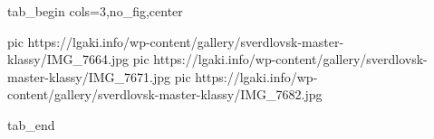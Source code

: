  
 
 
 
 


\ifcmt
  tab_begin cols=3,no_fig,center

     pic https://lgaki.info/wp-content/gallery/sverdlovsk-master-klassy/IMG_7664.jpg
     pic https://lgaki.info/wp-content/gallery/sverdlovsk-master-klassy/IMG_7671.jpg
     pic https://lgaki.info/wp-content/gallery/sverdlovsk-master-klassy/IMG_7682.jpg

  tab_end
\fi

